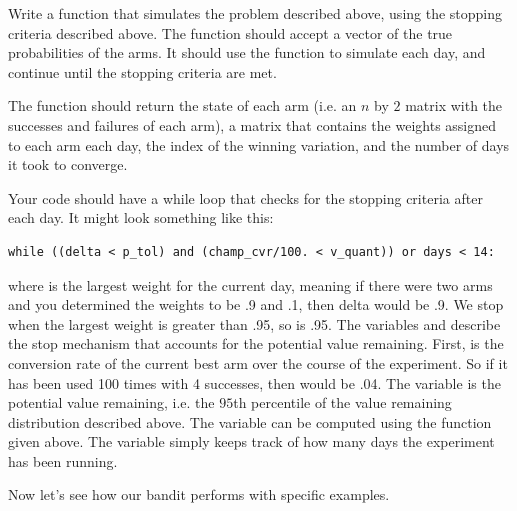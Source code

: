 \begin{problem}
Write a function  that simulates the problem described above, 
using the stopping criteria described above.
The function should accept a vector of the true probabilities of the arms.
It should use the  function to simulate each day, and
continue until the stopping criteria are met.

The function should return the state of each arm (i.e. an $n$ by $2$ matrix with the
successes and failures of each arm), a matrix that contains the weights assigned to
each arm each day, the index of the winning variation, and the number of days it took to converge.

Your code should have a while loop that checks for the stopping criteria after each day.
It might look something like this:
\begin{lstlisting}
while ((delta < p_tol) and (champ_cvr/100. < v_quant)) or days < 14:
\end{lstlisting}
where  is the largest weight for the current day, meaning if there were two arms and you determined the weights to be .9 and .1, then delta would be .9.  We stop when the largest weight is greater than .95, so  is .95.  The variables  and  describe the stop mechanism that accounts for the potential value remaining.  First,  is the conversion rate of the current best arm over the course of the experiment.  So if it has been used 100 times with 4 successes, then  would be .04.  The variable  is the potential value remaining, i.e. the $95$th percentile of the value remaining distribution described above.  The variable  can be computed using the  function given above.
The  variable simply keeps track of how many days the experiment has been running.
\end{problem}

Now let's see how our bandit performs with specific examples.

